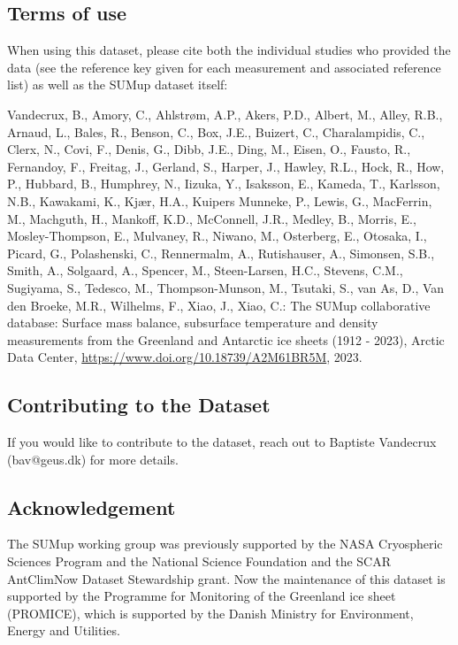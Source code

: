 \documentclass[journal abbreviation, manuscript]{copernicus}
\begin{document}
\subsection{Terms of use}

When using this dataset, please cite both the individual studies who provided the data (see the reference key given for each measurement and associated reference list) as well as the SUMup dataset itself:

\bigskip

Vandecrux, B., Amory, C., Ahlstrøm, A.P., Akers, P.D., Albert, M., Alley, R.B., Arnaud, L., Bales, R., Benson, C., Box, J.E., Buizert, C., Charalampidis, C., Clerx, N., Covi, F., Denis, G., Dibb, J.E., Ding, M., Eisen, O., Fausto, R., Fernandoy, F., Freitag, J., Gerland, S., Harper, J., Hawley, R.L., Hock, R., How, P., Hubbard, B., Humphrey, N., Iizuka, Y., Isaksson, E., Kameda, T., Karlsson, N.B., Kawakami, K., Kjær, H.A., Kuipers Munneke, P., Lewis, G., MacFerrin, M., Machguth, H., Mankoff, K.D., McConnell, J.R., Medley, B., Morris, E., Mosley-Thompson, E., Mulvaney, R., Niwano, M., Osterberg, E., Otosaka, I., Picard, G., Polashenski, C., Rennermalm, A., Rutishauser, A., Simonsen, S.B., Smith, A., Solgaard, A., Spencer, M., Steen-Larsen, H.C., Stevens, C.M., Sugiyama, S., Tedesco, M., Thompson-Munson, M., Tsutaki, S., van As, D., Van den Broeke, M.R., Wilhelms, F., Xiao, J., Xiao, C.: The SUMup collaborative database: Surface mass balance, subsurface temperature and density measurements from the Greenland and Antarctic ice sheets (1912 - 2023), Arctic Data Center, \url{https://www.doi.org/10.18739/A2M61BR5M}, 2023.

\subsection{Contributing to the Dataset}
If you would like to contribute to the dataset, reach out to Baptiste Vandecrux (bav@geus.dk) for more details.

\subsection{Acknowledgement}

The SUMup working group was previously supported by the NASA Cryospheric Sciences Program and the National Science Foundation and the SCAR AntClimNow Dataset Stewardship grant. Now the maintenance of this dataset is supported by the Programme for Monitoring of the Greenland ice sheet (PROMICE), which is supported by the Danish Ministry for Environment, Energy and Utilities.
\end{document}
